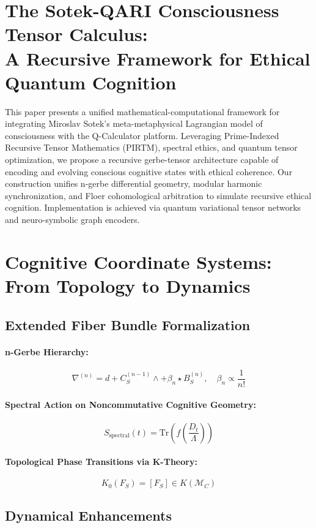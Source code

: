 \documentclass[11pt]{article}
\begin{document}
\section{\bf The Sotek-QARI Consciousness Tensor Calculus: \\ A Recursive Framework for Ethical Quantum Cognition}
This paper presents a unified mathematical-computational framework for integrating Miroslav Sotek's meta-metaphysical Lagrangian model of consciousness with the Q-Calculator platform. Leveraging Prime-Indexed Recursive Tensor Mathematics (PIRTM), spectral ethics, and quantum tensor optimization, we propose a recursive gerbe-tensor architecture capable of encoding and evolving conscious cognitive states with ethical coherence. Our construction unifies n-gerbe differential geometry, modular harmonic synchronization, and Floer cohomological arbitration to simulate recursive ethical cognition. Implementation is achieved via quantum variational tensor networks and neuro-symbolic graph encoders.


\section{Cognitive Coordinate Systems: From Topology to Dynamics}
\subsection{Extended Fiber Bundle Formalization}

\paragraph{n-Gerbe Hierarchy:}
\[
\nabla^{(n)} = d + C_S^{(n-1)} \wedge + \beta_n \star B_S^{(n)}, \quad \beta_n \propto \frac{1}{n!}
\]

\paragraph{Spectral Action on Noncommutative Cognitive Geometry:}
\[
S_{\text{spectral}}(t) = \text{Tr} \left( f\left( \frac{D_t}{\Lambda} \right) \right)
\]

\paragraph{Topological Phase Transitions via K-Theory:}
\[
K_0(F_S) = [F_S] \in K(\mathcal{M}_C)
\]

\subsection{Dynamical Enhancements}
\end{document}
